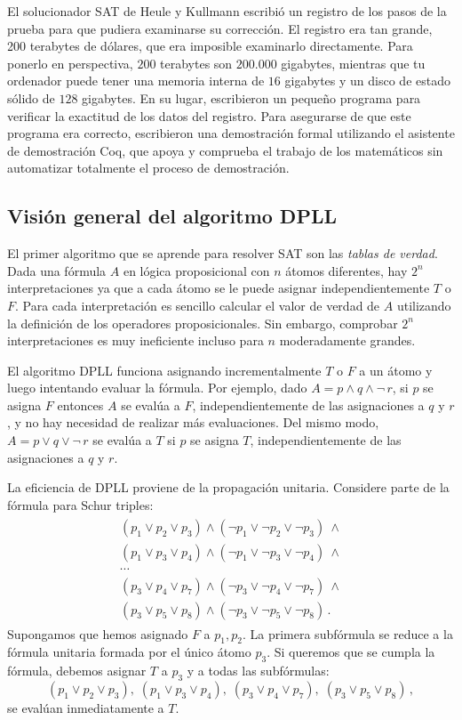 El solucionador SAT de Heule y Kullmann escribió un registro de los pasos de la prueba para que pudiera examinarse su corrección. El registro era tan grande, 200 terabytes de dólares, que era imposible examinarlo directamente. Para ponerlo en perspectiva, $200$ terabytes son $200.000$ gigabytes, mientras que tu ordenador puede tener una memoria interna de $16$ gigabytes y un disco de estado sólido de $128$ gigabytes. En su lugar, escribieron un pequeño programa para verificar la exactitud de los datos del registro. Para asegurarse de que este programa era correcto, escribieron una demostración formal utilizando el asistente de demostración Coq, que apoya y comprueba el trabajo de los matemáticos sin automatizar totalmente el proceso de demostración.

\subsection{Visión general del algoritmo DPLL}

El primer algoritmo que se aprende para resolver SAT son las \emph{tablas de verdad}. Dada una fórmula $A$ en lógica proposicional con $n$ átomos diferentes, hay $2^n$ interpretaciones ya que a cada átomo se le puede asignar independientemente $T$ o $F$. Para cada interpretación es sencillo calcular el valor de verdad de $A$ utilizando la definición de los operadores proposicionales. Sin embargo, comprobar $2^n$ interpretaciones es muy ineficiente incluso para $n$ moderadamente grandes.

El algoritmo DPLL funciona asignando incrementalmente $T$ o $F$ a un átomo y luego intentando evaluar la fórmula. Por ejemplo, dado $A=p \wedge q \wedge \neg\, r$, si $p$ se asigna $F$ entonces $A$ se evalúa a $F$, independientemente de las asignaciones a $q$ y $r$, y no hay necesidad de realizar más evaluaciones. Del mismo modo, $A=p\vee q \vee \neg\, r$ se evalúa a $T$ si $p$ se asigna $T$, independientemente de las asignaciones a $q$ y $r$.

La eficiencia de DPLL proviene de la propagación unitaria. Considere parte de la fórmula para Schur triples:
\begin{align}
\begin{array}{l}\label{eq.schur3}
(p_1 \vee p_2 \vee p_3) \wedge (\neg p_1 \vee \neg p_2 \vee \neg p_3) \:\wedge \\
(p_1 \vee p_3 \vee p_4) \wedge (\neg p_1 \vee \neg p_3 \vee \neg p_4) \:\wedge \\
\cdots\\
(p_3 \vee p_4 \vee p_7) \wedge (\neg p_3 \vee \neg p_4 \vee \neg p_7) \:\wedge \\
(p_3 \vee p_5 \vee p_8) \wedge (\neg p_3 \vee \neg p_5 \vee \neg p_8)\,.
\end{array}
\end{align}
Supongamos que hemos asignado $F$ a $p_1,p_2$. La primera subfórmula se reduce a la fórmula unitaria formada por el único átomo $p_3$. Si queremos que se cumpla la fórmula, debemos asignar $T$ a $p_3$ y a todas las subfórmulas:
\[
(p_1 \vee p_2 \vee p_3),\;(p_1 \vee p_3 \vee p_4),\;
(p_3 \vee p_4 \vee p_7),\;(p_3 \vee p_5 \vee p_8)\,,
\]
se evalúan inmediatamente a $T$.

